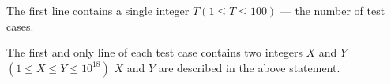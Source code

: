 The first line contains a single integer $T (1≤T≤100)$ --- the number of test cases.

The first and only line of each test case contains two integers $X$ and $Y$ $(1 \le X\le Y \le 10^{18})$ $X$ and $Y$ are described in the above statement.
